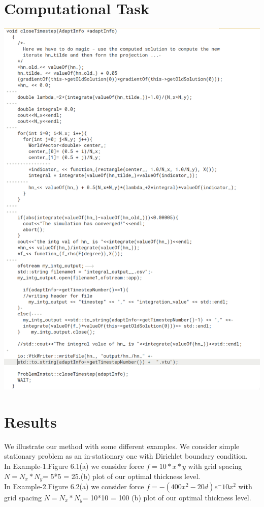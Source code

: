 \documentclass[paper=a4, fontsize=11pt]{scrartcl}
\numberwithin{equation}{section}		%
\numberwithin{figure}{section}			%
\numberwithin{table}{section}				%
\begin{document}
\section{Computational Task}
\includegraphics[scale=0.4]{Ctask3.png}


\section{Results} 

We illustrate our method with some different examples. We consider simple stationary problem as an in-stationary one with Dirichlet boundary condition.\\
In Example-1.Figure 6.1(a) we consider force $f = 10*x*y$ with grid spacing $N=N_{x}*N_{y}$= 5*5 = 25.(b) plot of our optimal thickness level.\\
In Example-2.Figure 6.2(a) we consider force $f = -(400x^2 - 20 d )e^-10x^2$ with grid spacing $N=N_{x}*N_{y}$= 10*10 = 100 (b) plot of our optimal thickness level.
\end{document}
